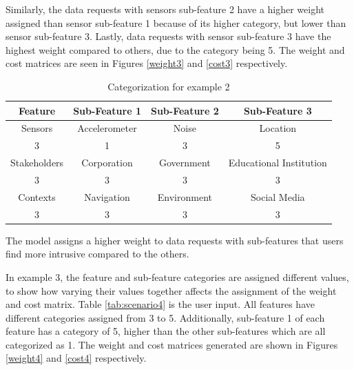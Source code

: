 Similarly, the data requests with sensors sub-feature 2 have a higher weight assigned than sensor sub-feature 1 because of its higher category, but lower than sensor sub-feature 3. Lastly, data requests with sensor sub-feature 3 have the highest weight compared to others, due to the category being 5. The weight and cost matrices are seen in Figures \ref{weight3} and \ref{cost3} respectively.

\begin{table}[h!]
  \centering
  \caption{Categorization for example 2}
  \label{tab:scenario3}
  \begin{tabular}{cccc}
    \toprule
    Feature & Sub-Feature 1 & Sub-Feature 2 & Sub-Feature 3\\
    \midrule
    Sensors & Accelerometer & Noise & Location\\
     3 & 1 & 3 & 5\\ \hhline{====}
     Stakeholders & Corporation & Government & Educational Institution\\
     3 & 3 & 3 & 3\\ \hhline{====}
     Contexts & Navigation & Environment & Social Media\\
     3 & 3 & 3 & 3\\ 
    \bottomrule
  \end{tabular}
\end{table}

% 


%


The model assigns a higher weight to data requests with sub-features that users find more intrusive compared to the others.

In example 3, the feature and sub-feature categories are assigned different values, to show how varying their values together affects the assignment of the weight and cost matrix. Table \ref{tab:scenario4} is the user input. All features have different categories assigned from 3 to 5. Additionally, sub-feature 1 of each feature has a category of 5, higher than the other sub-features which are all categorized as 1. The weight and cost matrices generated are shown in Figures \ref{weight4} and \ref{cost4} respectively. 

